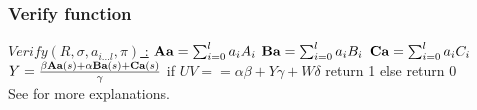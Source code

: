 \subsubsection{Verify function}
\underline{$Verify(R, \sigma, a_{i...l}, \pi)$ :}
\tabNormal $\textbf{Aa} = \sum_{i=0}^{l} a_i A_i$
\tabNormal $\textbf{Ba}=\sum_{i=0}^{l} a_i B_i$
\tabNormal $\textbf{Ca} =\sum_{i=0}^{l} a_i C_i$
\tabNormal $Y=\frac{\beta \textbf{Aa} (s) + \alpha \textbf{Ba} (s) + \textbf{Ca} (s)}{\gamma}$
\tabNormal if $UV == \alpha \beta + Y \gamma +  W\delta $ 
\tabOne return 1
\tabNormal else
\tabOne return 0 \\
See \cite{On_the_Size_of_Pairing_based_Non_interactive_Arguments} for more explanations.